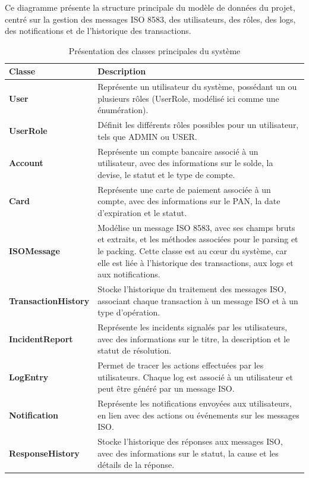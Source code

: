 {Ce diagramme présente la structure principale du modèle de données du projet, centré sur la gestion des messages ISO 8583, des utilisateurs, des rôles, des logs, des notifications et de l’historique des transactions.

\begin{table}[H]
\centering
{}
\renewcommand{\arraystretch}{1.5}
\begin{tabular}{|>{\bfseries}m{4cm}|m{11cm}|}
\hline
\rowcolor{blue!20}
\textbf{Classe} & \textbf{Description} \\
\hline
\textbf{User} & Représente un utilisateur du système, possédant un ou plusieurs rôles (UserRole, modélisé ici comme une énumération). \\
\hline
\textbf{UserRole} & Définit les différents rôles possibles pour un utilisateur, tels que ADMIN ou USER. \\
\hline
\textbf{Account} & Représente un compte bancaire associé à un utilisateur, avec des informations sur le solde, la devise, le statut et le type de compte. \\
\hline
\textbf{Card} & Représente une carte de paiement associée à un compte, avec des informations sur le PAN, la date d'expiration et le statut. \\
\hline
\textbf{ISOMessage} & Modélise un message ISO 8583, avec ses champs bruts et extraits, et les méthodes associées pour le parsing et le packing. Cette classe est au cœur du système, car elle est liée à l'historique des transactions, aux logs et aux notifications. \\
\hline
\textbf{TransactionHistory} & Stocke l'historique du traitement des messages ISO, associant chaque transaction à un message ISO et à un type d'opération. \\
\hline
\textbf{IncidentReport} & Représente les incidents signalés par les utilisateurs, avec des informations sur le titre, la description et le statut de résolution. \\
\hline
\textbf{LogEntry} & Permet de tracer les actions effectuées par les utilisateurs. Chaque log est associé à un utilisateur et peut être généré par un message ISO. \\
\hline
\textbf{Notification} & Représente les notifications envoyées aux utilisateurs, en lien avec des actions ou événements sur les messages ISO. \\
\hline
\textbf{ResponseHistory} & Stocke l'historique des réponses aux messages ISO, avec des informations sur le statut, la cause et les détails de la réponse. \\
\hline
\end{tabular}
\caption{Présentation des classes principales du système}
\label{tab:classes-principales}
\end{table}


}
